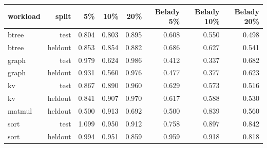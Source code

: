 \begin{tabular}{lrrrrrrr}
\toprule
workload & split & 5\% & 10\% & 20\% & Belady 5\% & Belady 10\% & Belady 20\% \\
\midrule
btree & test & 0.804 & 0.803 & 0.895 & 0.608 & 0.550 & 0.498 \\
btree & heldout & 0.853 & 0.854 & 0.882 & 0.686 & 0.627 & 0.541 \\
graph & test & 0.979 & 0.624 & 0.986 & 0.412 & 0.337 & 0.682 \\
graph & heldout & 0.931 & 0.560 & 0.976 & 0.477 & 0.377 & 0.623 \\
kv & test & 0.867 & 0.890 & 0.960 & 0.629 & 0.573 & 0.516 \\
kv & heldout & 0.841 & 0.907 & 0.970 & 0.617 & 0.588 & 0.530 \\
matmul & heldout & 0.500 & 0.913 & 0.692 & 0.500 & 0.839 & 0.560 \\
sort & test & 1.099 & 0.950 & 0.912 & 0.758 & 0.897 & 0.842 \\
sort & heldout & 0.994 & 0.951 & 0.859 & 0.959 & 0.918 & 0.818 \\
\bottomrule
\end{tabular}
